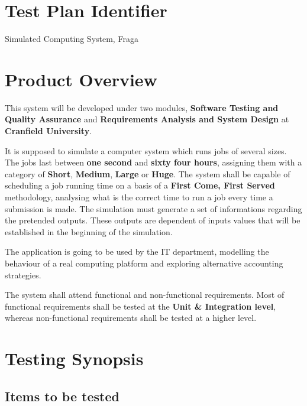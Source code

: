 \documentclass[12pt]{article}
\begin{document}
\section*{Test Plan Identifier}

Simulated Computing System, Fraga


\section*{Product Overview}
\par This system will be developed under two modules, \textbf{Software Testing and Quality Assurance} and  \textbf{Requirements Analysis and System Design} at \textbf{Cranfield University}. 
\par It is supposed to simulate a computer system which runs jobs of several sizes. The jobs last between \textbf{one second} and \textbf{sixty four hours}, assigning them with a category of \textbf{Short}, \textbf{Medium}, \textbf{Large} or \textbf{Huge}. The system shall be capable of scheduling a job running time on a basis of a \textbf{First Come, First Served} methodology, analysing what is the correct time to run a job every time a submission is made. The simulation must generate a set of informations regarding the pretended outputs. These outputs are dependent of inputs values that will be established in the beginning of the simulation.


\par The application is going to be used by the IT department, modelling the behaviour of a real computing platform and exploring alternative accounting strategies.

\par The system shall attend functional and non-functional requirements. Most of functional requirements shall be tested at the \textbf{Unit \& Integration level}, whereas non-functional requirements shall be tested at a higher level.

\section*{Testing Synopsis}

\subsection*{Items to be tested}
\end{document}
